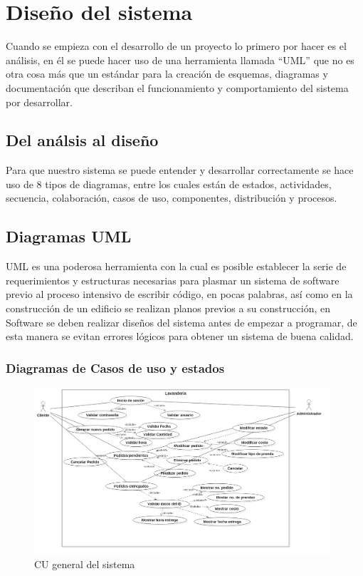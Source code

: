\section{Diseño del sistema}
Cuando se empieza con el desarrollo de un proyecto lo primero por hacer es el análisis, en él se puede hacer uso de una herramienta llamada “UML” que no es otra cosa más que un estándar para la creación de esquemas, diagramas y documentación que describan el funcionamiento y comportamiento del sistema por desarrollar.
\subsection{Del análsis al diseño}
Para que nuestro sistema se puede entender y desarrollar correctamente se hace uso de 8 tipos de diagramas, entre los cuales están de estados, actividades, secuencia, colaboración, casos de uso, componentes, distribución y procesos.
\subsection{Diagramas UML}
UML es una poderosa herramienta con la cual es posible establecer la serie de requerimientos y estructuras necesarias para plasmar un sistema de software previo al proceso intensivo de escribir código, en pocas palabras, así como en la construcción de un edificio se realizan planos previos a su construcción, en Software se deben realizar diseños del sistema antes de empezar a programar, de esta manera se evitan errores lógicos para obtener un sistema de buena calidad.

\newpage
\subsubsection{Diagramas de Casos de uso y estados}


\begin{figure}[htb]
\begin{center}
\includegraphics[width=11cm]{./imagenes/diagramas/CU_Lavanderia.png}
\end{center}
\caption{CU general del sistema}
\end{figure}


